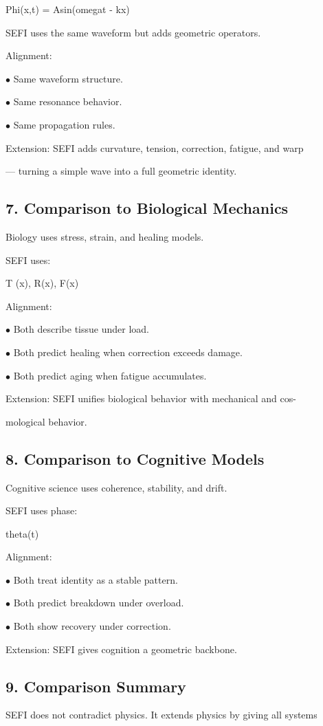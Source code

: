 \documentclass[10pt]{article}
\begin{document}
Phi(x,t) = Asin(omegat - kx)

SEFI uses the same waveform but adds geometric operators.

Alignment:

\noindent $\bullet$ Same waveform structure.

\noindent $\bullet$ Same resonance behavior.

\noindent $\bullet$ Same propagation rules.

Extension: SEFI adds curvature, tension, correction, fatigue, and warp

--- turning a simple wave into a full geometric identity.

\subsection*{7. Comparison to Biological Mechanics}
Biology uses stress, strain, and healing models.

SEFI uses:

T (x), R(x), F(x)

Alignment:

\noindent $\bullet$ Both describe tissue under load.

\noindent $\bullet$ Both predict healing when correction exceeds damage.

\noindent $\bullet$ Both predict aging when fatigue accumulates.

Extension: SEFI unifies biological behavior with mechanical and cos-

mological behavior.

\subsection*{8. Comparison to Cognitive Models}
Cognitive science uses coherence, stability, and drift.

SEFI uses phase:

theta(t)

Alignment:


\noindent $\bullet$ Both treat identity as a stable pattern.

\noindent $\bullet$ Both predict breakdown under overload.

\noindent $\bullet$ Both show recovery under correction.

Extension: SEFI gives cognition a geometric backbone.

\subsection*{9. Comparison Summary}
SEFI does not contradict physics. It extends physics by giving all systems
\end{document}
